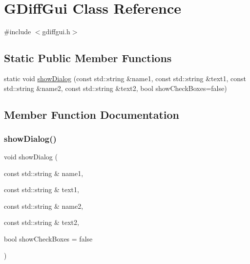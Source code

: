 \hypertarget{classGDiffGui}{}\section{G\+Diff\+Gui Class Reference}
\label{classGDiffGui}


{\ttfamily \#include $<$gdiffgui.\+h$>$}

\subsection*{Static Public Member Functions}
\begin{DoxyCompactItemize}
\item 
static void \mbox{\hyperlink{classGDiffGui_af28c4116df0cccf856806d7c551e38bc}{show\+Dialog}} (const std\+::string \&name1, const std\+::string \&text1, const std\+::string \&name2, const std\+::string \&text2, bool show\+Check\+Boxes=false)
\end{DoxyCompactItemize}


\subsection{Member Function Documentation}
\mbox{\label{classGDiffGui_af28c4116df0cccf856806d7c551e38bc}} 
\subsubsection{\texorpdfstring{show\+Dialog()}{showDialog()}}
{\footnotesize\ttfamily void show\+Dialog (\begin{DoxyParamCaption}\item[{const std\+::string \&}]{name1,  }\item[{const std\+::string \&}]{text1,  }\item[{const std\+::string \&}]{name2,  }\item[{const std\+::string \&}]{text2,  }\item[{bool}]{show\+Check\+Boxes = {\ttfamily false} }\end{DoxyParamCaption})\hspace{0.3cm}{\ttfamily [static]}}


